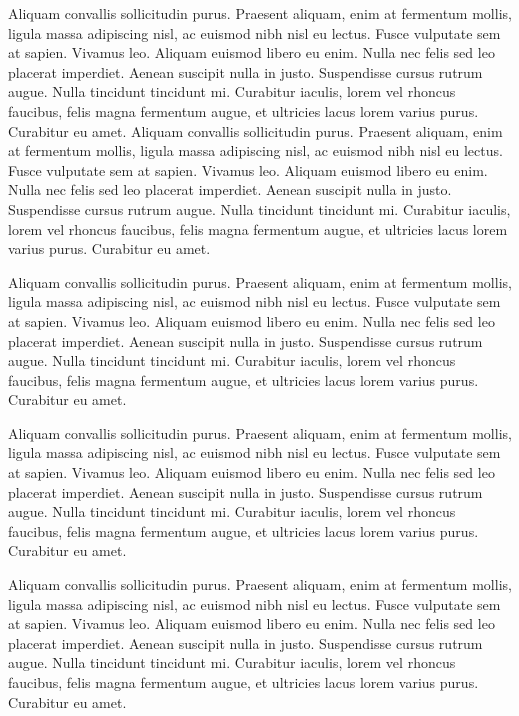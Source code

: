 \documentclass[twoside]{report}
\begin{document}
Aliquam convallis sollicitudin purus. Praesent aliquam, enim at fermentum mollis, ligula massa adipiscing nisl, ac euismod nibh nisl eu lectus. Fusce vulputate sem at sapien. Vivamus leo. Aliquam euismod libero eu enim. Nulla nec felis sed leo placerat imperdiet. Aenean suscipit nulla in justo. Suspendisse cursus rutrum augue. Nulla tincidunt tincidunt mi. Curabitur iaculis, lorem vel rhoncus faucibus, felis magna fermentum augue, et ultricies lacus lorem varius purus. Curabitur eu amet. Aliquam convallis sollicitudin purus. Praesent aliquam, enim at fermentum mollis, ligula massa adipiscing nisl, ac euismod nibh nisl eu lectus. Fusce vulputate sem at sapien. Vivamus leo. Aliquam euismod libero eu enim. Nulla nec felis sed leo placerat imperdiet. Aenean suscipit nulla in justo. Suspendisse cursus rutrum augue. Nulla tincidunt tincidunt mi. Curabitur iaculis, lorem vel rhoncus faucibus, felis magna fermentum augue, et ultricies lacus lorem varius purus. Curabitur eu amet.

Aliquam convallis sollicitudin purus. Praesent aliquam, enim at fermentum mollis, ligula massa adipiscing nisl, ac euismod nibh nisl eu lectus. Fusce vulputate sem at sapien. Vivamus leo. Aliquam euismod libero eu enim. Nulla nec felis sed leo placerat imperdiet. Aenean suscipit nulla in justo. Suspendisse cursus rutrum augue. Nulla tincidunt tincidunt mi. Curabitur iaculis, lorem vel rhoncus faucibus, felis magna fermentum augue, et ultricies lacus lorem varius purus. Curabitur eu amet.

Aliquam convallis sollicitudin purus. Praesent aliquam, enim at fermentum mollis, ligula massa adipiscing nisl, ac euismod nibh nisl eu lectus. Fusce vulputate sem at sapien. Vivamus leo. Aliquam euismod libero eu enim. Nulla nec felis sed leo placerat imperdiet. Aenean suscipit nulla in justo. Suspendisse cursus rutrum augue. Nulla tincidunt tincidunt mi. Curabitur iaculis, lorem vel rhoncus faucibus, felis magna fermentum augue, et ultricies lacus lorem varius purus. Curabitur eu amet.

Aliquam convallis sollicitudin purus. Praesent aliquam, enim at fermentum mollis, ligula massa adipiscing nisl, ac euismod nibh nisl eu lectus. Fusce vulputate sem at sapien. Vivamus leo. Aliquam euismod libero eu enim. Nulla nec felis sed leo placerat imperdiet. Aenean suscipit nulla in justo. Suspendisse cursus rutrum augue. Nulla tincidunt tincidunt mi. Curabitur iaculis, lorem vel rhoncus faucibus, felis magna fermentum augue, et ultricies lacus lorem varius purus. Curabitur eu amet.
\end{document}
